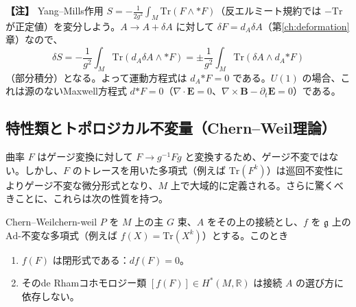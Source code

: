 \documentclass[uplatex, dvipdfmx, book]{jsbook}
\let\origsubsection\subsection
\let\origsubsubsection\subsubsection
\renewcommand{\section}{\origsubsection}
\renewcommand{\subsection}{\origsubsubsection}
\renewcommand{\subsubsection}{\paragraph}
\newenvironment{note}{\vspace{1ex}\par\footnotesize\noindent\textbf{【注】}}{\par\vspace{1ex}}
\begin{document}
\begin{note}
Yang--Mills作用 $S = -\frac{1}{2g^2}\int_M \mathrm{Tr}(F \wedge *F)$（反エルミート規約では $-\mathrm{Tr}$ が正定値）を変分しよう。$A \to A + \delta A$ に対して $\delta F = d_A \delta A$（第\ref{ch:deformation}章）なので、
\begin{equation*}
    \delta S = -\frac{1}{g^2}\int_M \mathrm{Tr}(d_A \delta A \wedge *F) = \pm\frac{1}{g^2}\int_M \mathrm{Tr}(\delta A \wedge d_A {*F})
\end{equation*}
（部分積分）となる。よって運動方程式は $d_A {*F} = 0$ である。$U(1)$ の場合、これは源のないMaxwell方程式 $d{*F} = 0$（$\nabla\cdot\bm{E} = 0$、$\nabla\times\bm{B} - \partial_t\bm{E} = 0$）である。
\end{note}

\section{特性類とトポロジカル不変量（Chern--Weil理論）}

曲率 $F$ はゲージ変換に対して $F \to g^{-1} F g$ と変換するため、ゲージ不変ではない。しかし、$F$ のトレースを用いた多項式（例えば $\mathrm{Tr}(F^k)$）は巡回不変性によりゲージ不変な微分形式となり、$M$ 上で大域的に定義される。さらに驚くべきことに、これらは次の性質を持つ。

\begin{mythm}{Chern--Weil}{chern-weil}
$P$ を $M$ 上の主 $G$ 束、$A$ をその上の接続とし、$f$ を $\mathfrak{g}$ 上の $\mathrm{Ad}$-不変な多項式（例えば $f(X) = \mathrm{Tr}(X^k)$）とする。このとき
\begin{enumerate}
    \item $f(F)$ は閉形式である：$d f(F) = 0$。
    \item そのde Rhamコホモロジー類 $[f(F)] \in H^{*}(M, \mathbb{R})$ は接続 $A$ の選び方に依存しない。
\end{enumerate}
\end{mythm}
\end{document}
